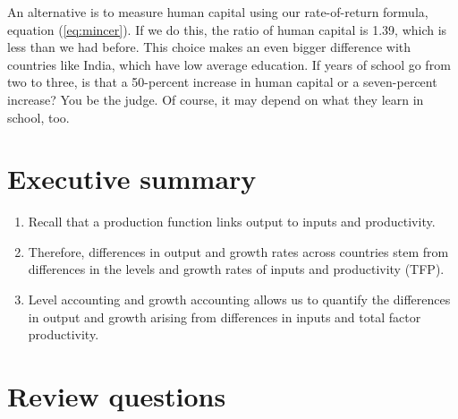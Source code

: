An alternative is to measure human capital using our
rate-of-return formula, equation (\ref{eq:mincer}).
If we do this, the ratio of human capital is 1.39,
which is less than we had before.
This choice makes an even bigger difference with countries
like India, which have low average education.
If years of school go from two to three, is that a 50-percent increase
in human capital or a seven-percent increase?
You be the judge.
Of course, it may depend on what they learn in school, too.


\section*{Executive summary}

\begin{enumerate}
\item Recall that a production function links output to inputs and productivity.

\item Therefore, differences in output and growth rates across countries
stem from differences in the levels and growth rates
of inputs and productivity (TFP).

\item Level accounting and growth accounting
 allows us to quantify the differences in output and growth arising from differences in inputs and total factor productivity.
\end{enumerate}

\section*{Review questions}

